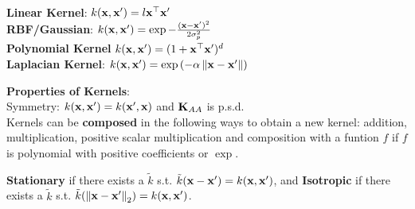 \begin{framed}
    \textbf{Linear Kernel}: $k(\mathbf{x}, \mathbf{x'}) = l \mathbf{x}^\top \mathbf{x'}$ \\
    \textbf{RBF/Gaussian}: $k(\mathbf{x}, \mathbf{x'}) = \exp{-\frac{(\mathbf{x}- \mathbf{x'})^2}{2\sigma_p^2}}$ \\
    \textbf{Polynomial Kernel} $k(\mathbf{x}, \mathbf{x'}) = (1 + \mathbf{x}^\top \mathbf{x'})^d$ \\
    \textbf{Laplacian Kernel}: $k(\vx, \vxp) = \exp{\left(-\alpha \norm{\vx - \vxp}\right)}$
\end{framed}
\begin{framed}
    \textbf{Properties of Kernels}:  \\
    Symmetry: $k(\mathbf{x}, \mathbf{x'}) = k(\mathbf{x'}, \mathbf{x})$ and $\mathbf{K}_{AA}$ is p.s.d. \\
    Kernels can be \textbf{composed} in the following ways to obtain a new kernel: addition, multiplication, positive scalar multiplication and composition with a funtion $f$ if $f$ is polynomial with positive coefficients or $\exp$.
\end{framed}
\textbf{Stationary} if there exists a $\tilde{k}$ s.t. $\tilde{k}(\mathbf{x} - \mathbf{x'}) = k(\mathbf{x}, \mathbf{x'})$, and \textbf{Isotropic} if there exists a $\tilde{k}$ s.t. $\tilde{k}(\norm{\vx-\vxp}_2) = k(\vx, \vxp)$.

